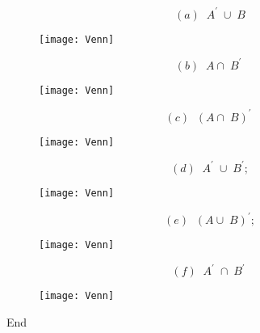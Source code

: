 \documentclass{beamer}
\begin{document}
\begin{frame}
\Large
\[(a) \;\; A^\prime \; \cup\; B\]
\begin{figure}
\centering
\texttt{[image: Venn]}
\end{figure}
\end{frame}
\begin{frame}
\Large
\[(b) \;\; A \cap\; B^\prime\;\]
\begin{figure}
\centering
\texttt{[image: Venn]}
\end{figure}
\end{frame}
\begin{frame}
\Large
\[(c) \;\; (A \cap \; B)^\prime\;\]
\begin{figure}
\centering
\texttt{[image: Venn]}
\end{figure}
\end{frame}
\begin{frame}
\Large
\[(d) \;\; A^\prime\; \cup\; B^\prime; \]
\begin{figure}
\centering
\texttt{[image: Venn]}
\end{figure}
\end{frame}
\begin{frame}
\Large
\[(e) \;\; (A \cup\; B)^\prime;\]
\begin{figure}
\centering
\texttt{[image: Venn]}
\end{figure}
\end{frame}
\begin{frame}
\Large
\[(f) \;\; A^\prime\; \cap\; B^\prime\;\]
\begin{figure}
\centering
\texttt{[image: Venn]}
\end{figure}
\end{frame}
\begin{frame}
End
\end{frame}
\end{document}
